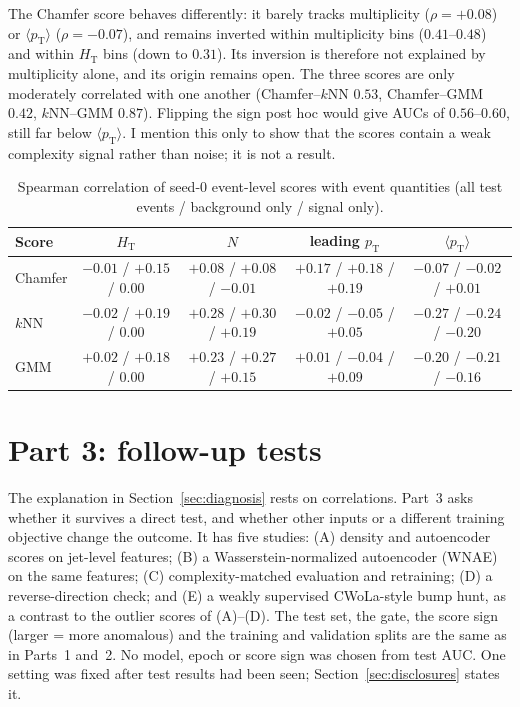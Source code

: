 \documentclass[11pt,a4paper]{article}
\newcommand{\pt}{\ensuremath{p_\mathrm{T}}\xspace}
\newcommand{\HT}{\ensuremath{H_\mathrm{T}}\xspace}
\newcommand{\ptmean}{\ensuremath{\langle \pt \rangle}\xspace}
\begin{document}
The Chamfer score behaves differently: it barely tracks multiplicity ($\rho=+0.08$) or \ptmean
($\rho=-0.07$), and remains inverted within multiplicity bins ($0.41$--$0.48$) and within \HT
bins (down to $0.31$). Its inversion is therefore not explained by multiplicity alone, and its
origin remains open. The three scores are only moderately correlated with one another (Chamfer--$k$NN
$0.53$, Chamfer--GMM $0.42$, $k$NN--GMM $0.87$). Flipping the sign post hoc would give AUCs of
$0.56$--$0.60$, still far below \ptmean. I mention this only to show that the scores contain a
weak complexity signal rather than noise; it is not a result.

\begin{table}[t]
\centering
\caption{Spearman correlation of seed-0 event-level scores with event quantities
(all test events / background only / signal only).}
\label{tab:corr}
\footnotesize\setlength{\tabcolsep}{4pt}
\begin{tabular}{lcccc}
\toprule
Score & \HT & $N$ & leading \pt & \ptmean \\
\midrule
Chamfer & $-0.01$ / $+0.15$ / $0.00$ & $+0.08$ / $+0.08$ / $-0.01$ & $+0.17$ / $+0.18$ / $+0.19$ & $-0.07$ / $-0.02$ / $+0.01$ \\
$k$NN   & $-0.02$ / $+0.19$ / $0.00$ & $+0.28$ / $+0.30$ / $+0.19$ & $-0.02$ / $-0.05$ / $+0.05$ & $-0.27$ / $-0.24$ / $-0.20$ \\
GMM     & $+0.02$ / $+0.18$ / $0.00$ & $+0.23$ / $+0.27$ / $+0.15$ & $+0.01$ / $-0.04$ / $+0.09$ & $-0.20$ / $-0.21$ / $-0.16$ \\
\bottomrule
\end{tabular}
\end{table}

\section{Part 3: follow-up tests}
\label{sec:part3}

The explanation in Section~\ref{sec:diagnosis} rests on correlations. Part~3 asks whether it
survives a direct test, and whether other inputs or a different training objective change the
outcome. It has five studies: (A) density and autoencoder scores on jet-level features;
(B) a Wasserstein-normalized autoencoder (WNAE) on the same features; (C) complexity-matched
evaluation and retraining; (D) a reverse-direction check; and (E) a weakly supervised
CWoLa-style bump hunt, as a contrast to the outlier scores of (A)--(D). The test set, the gate, the score
sign (larger = more anomalous) and the training and validation splits are the same as in
Parts~1 and~2. No model, epoch or score sign was chosen from test AUC. One setting was fixed
after test results had been seen; Section~\ref{sec:disclosures} states it.
\end{document}
